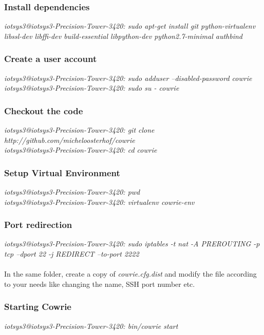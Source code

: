 \documentclass{report}
\begin{document}
\subsubsection{Install dependencies } 
\textit{{\color{blue}iotsys3@iotsys3-Precision-Tower-3420:} sudo apt-get install git python-virtualenv libssl-dev libffi-dev build-essential libpython-dev python2.7-minimal authbind}

\subsubsection{Create a user account } 
\textit{{\color{blue}iotsys3@iotsys3-Precision-Tower-3420:} sudo adduser --disabled-password cowrie}\\
\textit{{\color{blue}iotsys3@iotsys3-Precision-Tower-3420:} sudo su - cowrie}

\subsubsection{Checkout the code } 
\textit{{\color{blue}iotsys3@iotsys3-Precision-Tower-3420:} git clone http://github.com/micheloosterhof/cowrie}\\
\textit{{\color{blue}iotsys3@iotsys3-Precision-Tower-3420:} cd cowrie}


\subsubsection{Setup Virtual Environment } 
\textit{{\color{blue}iotsys3@iotsys3-Precision-Tower-3420:} pwd}\\
\textit{{\color{blue}iotsys3@iotsys3-Precision-Tower-3420:} virtualenv cowrie-env}

\subsubsection{Port redirection } 
\textit{{\color{blue}iotsys3@iotsys3-Precision-Tower-3420:} sudo iptables -t nat -A PREROUTING -p tcp --dport 22 -j REDIRECT --to-port 2222}

\paragraph{}
In the same folder, create a copy of \textit{cowrie.cfg.dist} and modify the file according to your needs like changing the name, SSH port number etc. 

\subsubsection{Starting Cowrie }
\textit{{\color{blue}iotsys3@iotsys3-Precision-Tower-3420:} bin/cowrie start}
\end{document}
